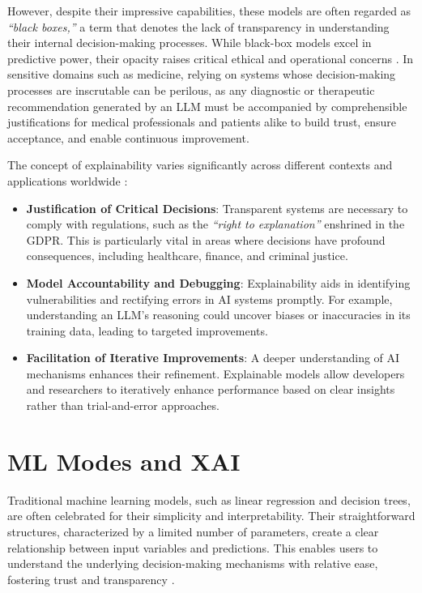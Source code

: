 \documentclass[times, twoside, watermark]{zHenriquesLab-StyleBioRxiv}
\begin{document}
However, despite their impressive capabilities, these models are often regarded as \textit{``black boxes,''} a term that denotes the lack of transparency in understanding their internal decision-making processes. While black-box models excel in predictive power, their opacity raises critical ethical and operational concerns \cite{hassija2024xai}. In sensitive domains such as medicine, relying on systems whose decision-making processes are inscrutable can be perilous, as any diagnostic or therapeutic recommendation generated by an LLM must be accompanied by comprehensible justifications for medical professionals and patients alike to build trust, ensure acceptance, and enable continuous improvement.

The concept of explainability varies significantly across different contexts and applications worldwide \cite{typeexplain}:

\begin{itemize}
    \item \textbf{Justification of Critical Decisions}: Transparent systems are necessary to comply with regulations, such as the \textit{``right to explanation''} enshrined in the GDPR. This is particularly vital in areas where decisions have profound consequences, including healthcare, finance, and criminal justice.
    \item \textbf{Model Accountability and Debugging}: Explainability aids in identifying vulnerabilities and rectifying errors in AI systems promptly. For example, understanding an LLM’s reasoning could uncover biases or inaccuracies in its training data, leading to targeted improvements.
    \item \textbf{Facilitation of Iterative Improvements}: A deeper understanding of AI mechanisms enhances their refinement. Explainable models allow developers and researchers to iteratively enhance performance based on clear insights rather than trial-and-error approaches.
\end{itemize}


\section*{ML Modes and XAI}
Traditional machine learning models, such as linear regression and decision trees, are often celebrated for their simplicity and interpretability. Their straightforward structures, characterized by a limited number of parameters, create a clear relationship between input variables and predictions. This enables users to understand the underlying decision-making mechanisms with relative ease, fostering trust and transparency \cite{james2013introduction}.
\end{document}
